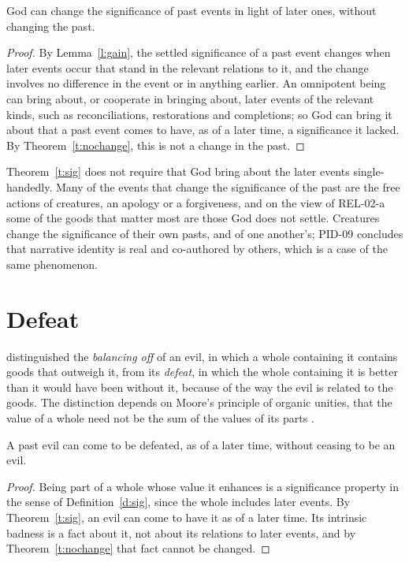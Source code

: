 \documentclass{situationist-preprint}
\begin{document}
\begin{theorem}\label{t:sig}
God can change the significance of past events in light of later ones, without changing the past.
\end{theorem}

\begin{proof}
By Lemma~\ref{l:gain}, the settled significance of a past event changes when later events occur that stand in the relevant relations to it, and the change involves no difference in the event or in anything earlier. An omnipotent being can bring about, or cooperate in bringing about, later events of the relevant kinds, such as reconciliations, restorations and completions; so God can bring it about that a past event comes to have, as of a later time, a significance it lacked. By Theorem~\ref{t:nochange}, this is not a change in the past.
\end{proof}

Theorem~\ref{t:sig} does not require that God bring about the later events single-handedly. Many of the events that change the significance of the past are the free actions of creatures, an apology or a forgiveness, and on the view of REL-02-a some of the goods that matter most are those God does not settle. Creatures change the significance of their own pasts, and of one another's; PID-09 concludes that narrative identity is real and co-authored by others, which is a case of the same phenomenon.

\section{Defeat}

\citet{Chisholm1968} distinguished the \emph{balancing off} of an evil, in which a whole containing it contains goods that outweigh it, from its \emph{defeat}, in which the whole containing it is better than it would have been without it, because of the way the evil is related to the goods. The distinction depends on Moore's principle of organic unities, that the value of a whole need not be the sum of the values of its parts \citep[§18]{Moore1903}.

\begin{corollary}\label{c:defeat}
A past evil can come to be defeated, as of a later time, without ceasing to be an evil.
\end{corollary}

\begin{proof}
Being part of a whole whose value it enhances is a significance property in the sense of Definition~\ref{d:sig}, since the whole includes later events. By Theorem~\ref{t:sig}, an evil can come to have it as of a later time. Its intrinsic badness is a fact about it, not about its relations to later events, and by Theorem~\ref{t:nochange} that fact cannot be changed.
\end{proof}
\end{document}
